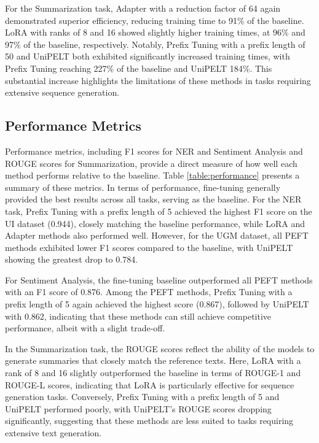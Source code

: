 For the Summarization task, Adapter with a reduction factor of 64 again demonstrated superior efficiency, reducing training time to 91\% of the baseline. LoRA with ranks of 8 and 16 showed slightly higher training times, at 96\% and 97\% of the baseline, respectively. Notably, Prefix Tuning with a prefix length of 50 and UniPELT both exhibited significantly increased training times, with Prefix Tuning reaching 227\% of the baseline and UniPELT 184\%. This substantial increase highlights the limitations of these methods in tasks requiring extensive sequence generation.

\subsection{Performance Metrics}

Performance metrics, including F1 scores for NER and Sentiment Analysis and ROUGE scores for Summarization, provide a direct measure of how well each method performs relative to the baseline. Table \ref{table:performance} presents a summary of these metrics. In terms of performance, fine-tuning generally provided the best results across all tasks, serving as the baseline. For the NER task, Prefix Tuning with a prefix length of 5 achieved the highest F1 score on the UI dataset (0.944), closely matching the baseline performance, while LoRA and Adapter methods also performed well. However, for the UGM dataset, all PEFT methods exhibited lower F1 scores compared to the baseline, with UniPELT showing the greatest drop to 0.784.

For Sentiment Analysis, the fine-tuning baseline outperformed all PEFT methods with an F1 score of 0.876. Among the PEFT methods, Prefix Tuning with a prefix length of 5 again achieved the highest score (0.867), followed by UniPELT with 0.862, indicating that these methods can still achieve competitive performance, albeit with a slight trade-off.

In the Summarization task, the ROUGE scores reflect the ability of the models to generate summaries that closely match the reference texts. Here, LoRA with a rank of 8 and 16 slightly outperformed the baseline in terms of ROUGE-1 and ROUGE-L scores, indicating that LoRA is particularly effective for sequence generation tasks. Conversely, Prefix Tuning with a prefix length of 5 and UniPELT performed poorly, with UniPELT's ROUGE scores dropping significantly, suggesting that these methods are less suited to tasks requiring extensive text generation.

